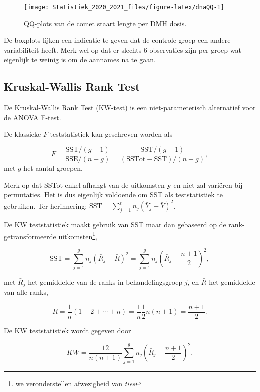 \documentclass[
  12pt,dutch,coursenotes]{book}
\theoremstyle{definition}
\theoremstyle{definition}
\theoremstyle{definition}
\theoremstyle{remark}
\begin{document}
\begin{figure}

{\centering \texttt{[image: Statistiek\_2020\_2021\_files/figure-latex/dnaQQ-1]} 

}

\caption{QQ-plots van de comet staart lengte per DMH dosis.}\label{fig:dnaQQ}
\end{figure}

De boxplots lijken een indicatie te geven dat de controle groep een andere variabiliteit heeft.
Merk wel op dat er slechts 6 observaties zijn per groep wat eigenlijk te weinig is om de aannames na te gaan.

\hypertarget{kruskal-wallis-rank-test}{%
\subsection{Kruskal-Wallis Rank Test}\label{kruskal-wallis-rank-test}}

De Kruskal-Wallis Rank Test (KW-test) is een niet-parameterisch alternatief voor de ANOVA F-test.

De klassieke \(F\)-teststatistiek kan geschreven worden als

\[
    F = \frac{\text{SST}/(g-1)}{\text{SSE}/(n-g)} = \frac{\text{SST}/(g-1)}{(\text{SSTot}-\text{SST})/(n-g)} ,
  \]
met \(g\) het aantal groepen.

Merk op dat SSTot enkel afhangt van de uitkomsten \(\mathbf{y}\) en niet zal variëren bij permutaties. Het is dus eigenlijk voldoende om SST als teststatistiek te gebruiken. Ter herinnering: \(\text{SST}=\sum_{j=1}^t n_j(\bar{Y}_j-\bar{Y})^2\).

De KW teststatistiek maakt gebruik van SST maar dan gebaseerd op de rank-getransformeerde uitkomsten\footnote{we veronderstellen afwezigheid van \emph{ties}},

\[
     \text{SST} = \sum_{j=1}^g n_j \left(\bar{R}_j - \bar{R}\right)^2 = \sum_{j=1}^g n_j \left(\bar{R}_j - \frac{n+1}{2}\right)^2 ,
  \]

met \(\bar{R}_j\) het gemiddelde van de ranks in behandelingsgroep \(j\), en \(\bar{R}\) het gemiddelde van alle ranks,

\[
    \bar{R} = \frac{1}{n}(1+2+\cdots + n) = \frac{1}{n}\frac{1}{2}n(n+1) = \frac{n+1}{2}.
  \]

De KW teststatistiek wordt gegeven door

\[
    KW = \frac{12}{n(n+1)}  \sum_{j=1}^g n_j \left(\bar{R}_j - \frac{n+1}{2}\right)^2.
  \]
\end{document}
